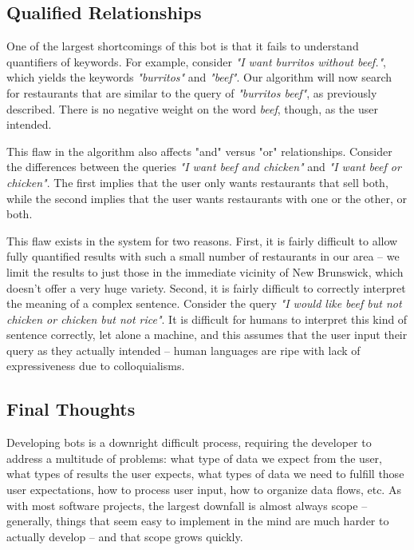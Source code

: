\documentclass{article}
\begin{document}
    \subsection{Qualified Relationships}
        One of the largest shortcomings of this bot is that it fails to understand quantifiers of keywords. For example, consider \textit{"I want burritos without beef."}, which yields the keywords \textit{"burritos"} and \textit{"beef"}. Our algorithm will now search for restaurants that are similar to the query of \textit{"burritos beef"}, as previously described. There is no negative weight on the word \textit{beef}, though, as the user intended.
    
        This flaw in the algorithm also affects "and" versus "or" relationships. Consider the differences between the queries \textit{"I want beef and chicken"} and \textit{"I want beef or chicken"}. The first implies that the user only wants restaurants that sell both, while the second implies that the user wants restaurants with one or the other, or both.
        
        This flaw exists in the system for two reasons. First, it is fairly difficult to allow fully quantified results with such a small number of restaurants in our area -- we limit the results to just those in the immediate vicinity of New Brunswick, which doesn't offer a very huge variety. Second, it is fairly difficult to correctly interpret the meaning of a complex sentence. Consider the query \textit{"I would like beef but not chicken or chicken but not rice"}. It is difficult for humans to interpret this kind of sentence correctly, let alone a machine, and this assumes that the user input their query as they actually intended -- human languages are ripe with lack of expressiveness due to colloquialisms.

    \subsection{Final Thoughts}
        Developing bots is a downright difficult process, requiring the developer to address a multitude of problems: what type of data we expect from the user, what types of results the user expects, what types of data we need to fulfill those user expectations, how to process user input, how to organize data flows, etc. As with most software projects, the largest downfall is almost always scope -- generally, things that seem easy to implement in the mind are much harder to actually develop -- and that scope grows quickly. 
        
\end{document}
